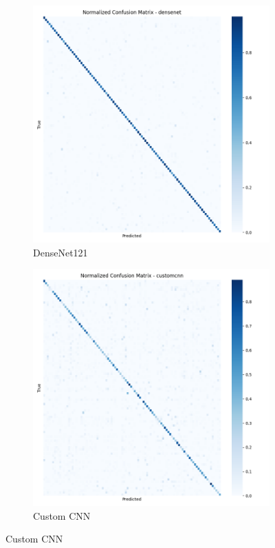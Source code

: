 \documentclass[11pt]{article}
\begin{document}
\begin{figure}[htbp]
\centering
\captionsetup[subfigure]{labelformat=empty}

\begin{subfigure}[b]{0.48\textwidth}
\includegraphics[width=\textwidth]{confusion_matrix_densenet121_full.png}
\caption{DenseNet121}
\end{subfigure}
\hfill
\begin{subfigure}[b]{0.48\textwidth}
\includegraphics[width=\textwidth]{confusion_matrix_customcnn_full.png}
\caption{Custom CNN}
\end{subfigure}


\end{figure}
\end{document}
